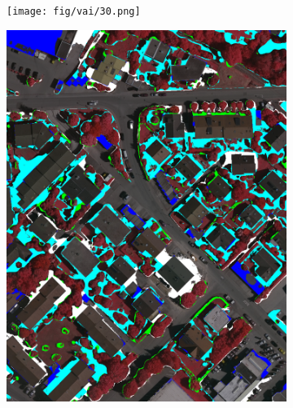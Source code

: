 \begin{figure}[H]
\begin{subfigure}{0.325\columnwidth}
  \centering
  \texttt{[image: fig/vai/30.png]} 
\end{subfigure}\vspace{1mm}
\begin{subfigure}{0.325\columnwidth}
  \centering
  \includegraphics[width=1\linewidth]{fig/vai/30_diff_manual.png}
\end{subfigure}
\begin{subfigure}{0.325\columnwidth}
  \centering

\end{subfigure}
\end{figure}
